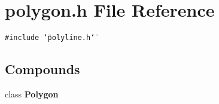 \section{polygon.h File Reference}
\label{polygon_8h}
{\tt \#include \char`\"{}polyline.h\char`\"{}}\par
\subsection*{Compounds}
\begin{CompactItemize}
\item 
class {\bf Polygon}
\end{CompactItemize}
